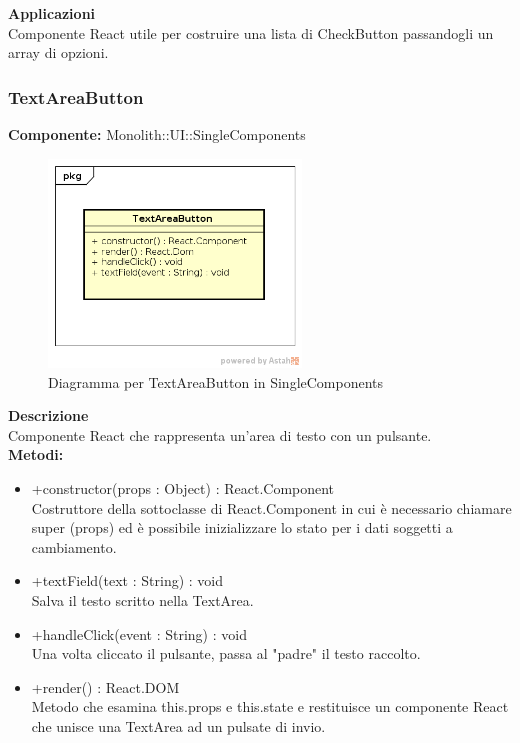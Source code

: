 \textbf{Applicazioni}\\
Componente React utile per costruire una lista di CheckButton passandogli un array di opzioni. 


\clearpage

\subsubsection{TextAreaButton}
\textbf{Componente:}  Monolith::UI::SingleComponents\\
   \FloatBarrier
   \begin{figure}[ht]
   \centering
   \includegraphics[width=0.6\textwidth]{img/single-TextAreaButton.png}
   \caption{{Diagramma per TextAreaButton in SingleComponents}}
\end{figure}
\FloatBarrier
\textbf{Descrizione}\\
Componente React che rappresenta un'area di testo con un pulsante. \\
\textbf{Metodi:} 
\begin{itemize}

\item +constructor(props : Object) : React.Component 
\\
Costruttore della sottoclasse di React.Component in cui è necessario chiamare super (props) ed è possibile inizializzare lo stato per i dati soggetti a cambiamento.

\item +textField(text : String) : void 
\\
Salva il testo scritto nella TextArea.

\item +handleClick(event : String) : void  
\\
Una volta cliccato il pulsante, passa al "padre" il testo raccolto. 

\item +render() : React.DOM 
\\
Metodo che esamina this.props e this.state e restituisce un componente React che unisce una TextArea ad un pulsate di invio.

\end{itemize} 


